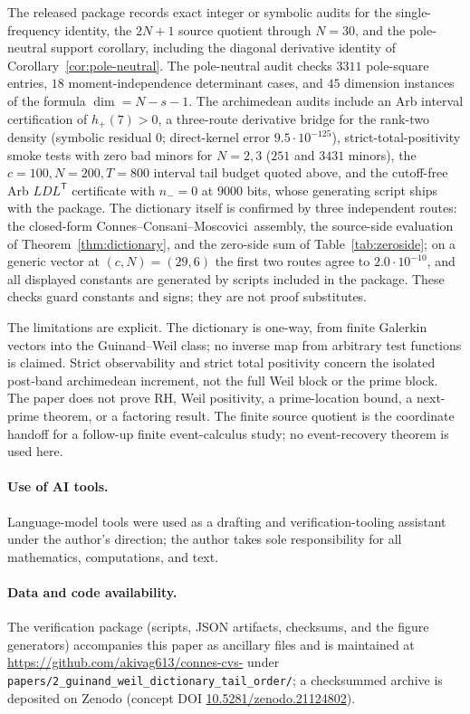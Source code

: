 \documentclass[11pt]{article}
\theoremstyle{plain}
\theoremstyle{definition}
\theoremstyle{remark}
\newcommand{\ccm}{Connes--Consani--Moscovici}
\begin{document}
The released package records exact integer or symbolic audits for the
single-frequency identity, the $2N{+}1$ source quotient through $N=30$, and the
pole-neutral support corollary, including the diagonal derivative identity of
Corollary~\ref{cor:pole-neutral}.  The pole-neutral audit checks $3311$
pole-square entries, $18$ moment-independence determinant cases, and $45$
dimension instances of the formula $\dim=N-s-1$.  The archimedean audits
include an Arb interval certification of $h_+(7)>0$, a three-route derivative
bridge for the rank-two density (symbolic residual $0$; direct-kernel error
$9.5\cdot10^{-125}$), strict-total-positivity smoke tests with zero bad
minors for $N=2,3$ ($251$ and $3431$ minors), the $c=100,N=200,T=800$
interval tail budget quoted above, and the cutoff-free Arb
$LDL^{\mathsf T}$ certificate with $n_-=0$ at $9000$ bits, whose generating
script ships with the package.  The dictionary itself is confirmed by three
independent routes: the closed-form \ccm\ assembly, the source-side
evaluation of Theorem~\ref{thm:dictionary}, and the zero-side sum of
Table~\ref{tab:zeroside}; on a generic vector at $(c,N)=(29,6)$ the first two
routes agree to $2.0\cdot10^{-10}$, and all displayed constants are generated
by scripts included in the package.  These checks guard constants and signs;
they are not proof substitutes.

The limitations are explicit.  The dictionary is one-way, from finite
Galerkin vectors into the Guinand--Weil class; no inverse map from arbitrary
test functions is claimed.  Strict observability and strict total positivity
concern the isolated post-band archimedean increment, not the full Weil
block or the prime block.  The paper does not prove
RH, Weil positivity, a prime-location bound, a next-prime theorem, or a
factoring result.  The finite source quotient is the coordinate handoff for a
follow-up finite event-calculus study; no event-recovery theorem is used
here.

\paragraph{Use of AI tools.}
Language-model tools were used as a drafting and verification-tooling
assistant under the author's direction; the author takes sole responsibility
for all mathematics, computations, and text.

\paragraph{Data and code availability.}
The verification package (scripts, JSON artifacts, checksums, and the figure
generators) accompanies this paper as ancillary files and is maintained at
\url{https://github.com/akivag613/connes-cvs-} under
\texttt{papers/2\_guinand\_weil\_dictionary\_tail\_order/}; a checksummed archive is
deposited on
Zenodo (concept DOI \href{https://doi.org/10.5281/zenodo.21124802}{10.5281/zenodo.21124802}).

{\small\raggedright


}
\end{document}
